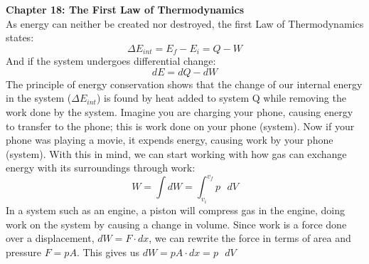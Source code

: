 \documentclass[11pt]{article}
\begin{document}
    \newpage
    \noindent \textbf{Chapter 18: The First Law of Thermodynamics}
    \\ \noindent \newline As energy can neither be created nor destroyed, the first Law of Thermodynamics states:
    \begin{equation}
        \Delta E_{int} = E_f - E_i = Q - W
    \end{equation}
    \noindent And if the system undergoes differential change:
    \begin{equation}
        dE = dQ - dW
    \end{equation}
    The principle of energy conservation shows that the change of our internal energy in the system ($\Delta E_{int}$)
    is found by heat added to system Q while removing the work done by the system.
    Imagine you are charging your phone, causing energy to transfer to the phone;
    this is work done on your phone (system).
    Now if your phone was playing a movie, it expends energy, causing work by your phone (system).
    With this in mind, we can start working with how gas can exchange energy with its surroundings through work:
    \begin{equation}
        W = \int dW = \int_{v_i}^{v_f} p \text{ } dV
    \end{equation}
    In a system such as an engine, a piston will compress gas in the engine, doing work on the system by
    causing a change in volume.
    Since work is a force done over a displacement, $dW = F \cdot dx$,
    we can rewrite the force in terms of area and pressure $F = pA$.
    This gives us $dW = pA \cdot dx = p \text{ }dV$
\end{document}
